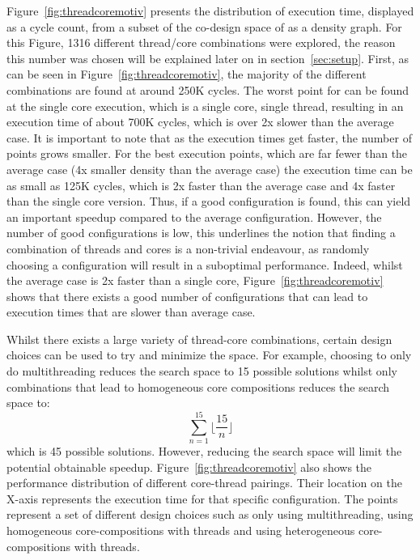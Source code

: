 Figure~\ref{fig:threadcoremotiv} presents the distribution of execution time, displayed as a cycle count, from a subset of the co-design space of  as a density graph.
For this Figure, 1316 different thread/core combinations were explored, the reason this number was chosen will be explained later on in section~\ref{sec:setup}.
First, as can be seen in Figure~\ref{fig:threadcoremotiv}, the majority of the different combinations are found at around 250K cycles.
The worst point for  can be found at the single core execution, which is a single core, single thread, resulting in an execution time of about 700K cycles, which is over 2x slower than the average case.
It is important to note that as the execution times get faster, the number of points grows smaller.
For the best execution points, which are far fewer than the average case (4x smaller density than the average case) the execution time can be as small as 125K cycles, which is 2x faster than the average case and 4x faster than the single core version.
Thus, if a good configuration is found, this can yield an important speedup compared to the average configuration.
However, the number of good configurations is low, this underlines the notion that finding a combination of threads and cores is a non-trivial endeavour, as randomly choosing a configuration will result in a suboptimal performance.
Indeed, whilst the average case is 2x faster than a single core, Figure~\ref{fig:threadcoremotiv} shows that there exists a good number of configurations that can lead to execution times that are slower than average case.

Whilst there exists a large variety of thread-core combinations, certain design choices can be used to try and minimize the space.
For example, choosing to only do multithreading reduces the search space to 15 possible solutions whilst only combinations that lead to homogeneous core compositions reduces the search space to:
\begin{equation}
\sum_{n=1}^{15} \lfloor\frac{15}{n}\rfloor
\end{equation}
which is 45 possible solutions.
However, reducing the search space will limit the potential obtainable speedup.
Figure~\ref{fig:threadcoremotiv} also shows the performance distribution of different core-thread pairings.
Their location on the X-axis represents the execution time for that specific configuration.
The points represent a set of different design choices such as only using multithreading, using homogeneous core-compositions with threads and using heterogeneous core-compositions with threads.

